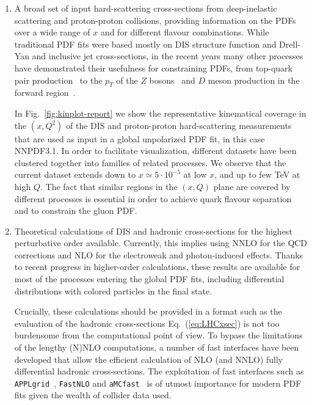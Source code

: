 \begin{enumerate}
\item A broad set of input hard-scattering cross-sections from deep-inelastic
  scattering and proton-proton collisions, providing information on the PDFs
  over a wide range of $x$ and for different flavour combinations.
  While traditional PDF fits were based mostly on DIS structure function and Drell-Yan
  and inclusive jet
  cross-sections, in the recent years many other processes have demonstrated
  their usefulness for constraining PDFs, from top-quark pair production~\cite{Czakon:2016olj}
  to the $p_T$ of the $Z$ bosons~\cite{Boughezal:2017nla}
  and $D$ meson production in the forward region~\cite{Gauld:2016kpd}.

  In Fig.~\ref{fig:kinplot-report} we show the representative kinematical coverage in the
    $(x,Q^2)$ of the DIS and proton-proton hard-scattering measurements that are
    used as input in a global unpolarized PDF fit, in this case NNPDF3.1.
    In order to facilitate visualization, different
    datasets have been clustered together into families of
    related processes.
    We observe that the current dataset extends down to $x\simeq 5\cdot 10^{-5}$
    at low $x$, and up to few TeV at high $Q$.
    The fact that similar regions in the $(x,Q)$ plane are covered by
    different processes is essential in order to achieve quark
    flavour separation and to constrain the gluon PDF.

  \item Theoretical calculations of DIS and hadronic cross-sections
    for the highest perturbative order available.
    Currently, this implies using NNLO for the QCD corrections and NLO
    for the electroweak and photon-induced effects.
    Thanks to recent progress in higher-order calculations, these results
    are available for most of the processes entering the global
    PDF fits, including differential distributions with colored particles
    in the final state.


    Crucially, these calculations should be provided in
    a format such as the evaluation of the hadronic
    cross-sections Eq.~(\ref{eq:LHCxsec}) is not too burdensome
    from the computational point of view.
    To bypass the limitations of the lengthy (N)NLO
    computations, a number of fast interfaces have
    been developed that allow the efficient calculation
    of NLO (and NNLO) fully differential hadronic cross-sections.
    The exploitation of fast interfaces such as {\tt APPLgrid}~\cite{Carli:2010rw},
    {\tt FastNLO} and {\tt aMCfast}~\cite{Bertone:2014zva} is of utmost importance
    for modern PDF fits given the wealth of collider data used.


\end{enumerate}
